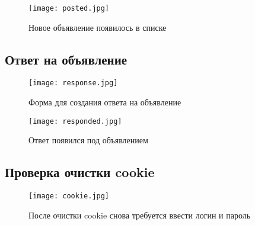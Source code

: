 \documentclass{article}
\begin{document}
\begin{figure}[H]
	\begin{flushleft}
		\centerline{\texttt{[image: posted.jpg]}}
		\caption{Новое объявление появилось в списке}
	\end{flushleft}
\end{figure}

\subsection{Ответ на объявление}
\begin{figure}[H]
	\begin{flushleft}
		\centerline{\texttt{[image: response.jpg]}}
		\caption{Форма для создания ответа на объявление}
	\end{flushleft}
\end{figure}

\begin{figure}[H]
	\begin{flushleft}
		\centerline{\texttt{[image: responded.jpg]}}
		\caption{Ответ появился под объявлением}
	\end{flushleft}
\end{figure}

\subsection{Проверка очистки cookie}
\begin{figure}[H]
	\begin{flushleft}
		\centerline{\texttt{[image: cookie.jpg]}}
		\caption{После очистки cookie снова требуется ввести логин и пароль}
	\end{flushleft}
\end{figure}
\end{document}
